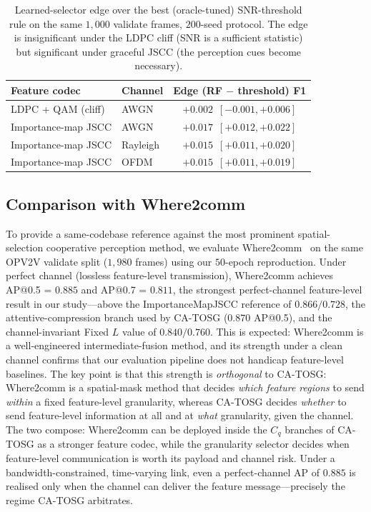 \documentclass[journal]{IEEEtran}
\newcommand{\method}{CA-TOSG}
\begin{document}
\begin{table}[t]
\centering
\caption{Learned-selector edge over the best (oracle-tuned) SNR-threshold rule on the
same $1{,}000$ validate frames, $200$-seed protocol. The edge is insignificant under the
LDPC cliff (SNR is a sufficient statistic) but significant under graceful JSCC (the
perception cues become necessary).}
\label{tab:two_regime}
\begin{tabular}{llc}
\toprule
Feature codec & Channel & Edge (RF $-$ threshold) F1 \\
\midrule
LDPC + QAM (cliff)      & AWGN     & $+0.002$~$[-0.001,+0.006]$ \\
Importance-map JSCC     & AWGN     & $\mathbf{+0.017}$~$[+0.012,+0.022]$ \\
Importance-map JSCC     & Rayleigh & $\mathbf{+0.015}$~$[+0.011,+0.020]$ \\
Importance-map JSCC     & OFDM     & $\mathbf{+0.015}$~$[+0.011,+0.019]$ \\
\bottomrule
\end{tabular}
\end{table}

\subsection{Comparison with Where2comm}\label{sec:where2comm}

To provide a same-codebase reference against the most prominent
spatial-selection cooperative perception method, we evaluate
Where2comm~\cite{hu2022where2comm} on the same OPV2V validate split
($1{,}980$ frames) using our $50$-epoch reproduction. Under perfect
channel (lossless feature-level transmission), Where2comm achieves
AP@0.5 = $0.885$ and AP@0.7 = $0.811$, the strongest perfect-channel
feature-level result in our study---above the ImportanceMapJSCC
reference of $0.866 / 0.728$, the attentive-compression branch used by
\method{} ($0.870$ AP@0.5), and the channel-invariant Fixed $L$ value of
$0.840 / 0.760$. This is expected: Where2comm is a well-engineered
intermediate-fusion method, and its strength under a clean channel
confirms that our evaluation pipeline does not handicap feature-level
baselines. The key point is that this strength is \emph{orthogonal} to
\method: Where2comm is a spatial-mask method that decides \emph{which
feature regions} to send \emph{within} a fixed feature-level granularity,
whereas \method{} decides \emph{whether} to send feature-level
information at all and at \emph{what} granularity, given the channel.
The two compose: Where2comm can be deployed inside the $C_q$ branches of
\method{} as a stronger feature codec, while the granularity selector
decides when feature-level communication is worth its payload and channel
risk. Under a bandwidth-constrained, time-varying link, even a
perfect-channel AP of $0.885$ is realised only when the channel can
deliver the feature message---precisely the regime \method{} arbitrates.
\end{document}

